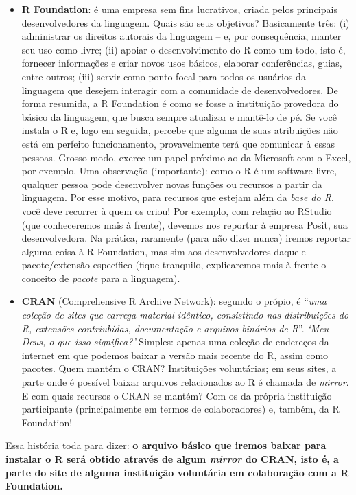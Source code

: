 \documentclass[
  letterpaper,
  DIV=11,
  numbers=noendperiod]{scrreprt}
\begin{document}
\begin{tcolorbox}
\begin{itemize}
\item
  \textbf{R Foundation}: é uma empresa sem fins lucrativos, criada pelos
  principais desenvolvedores da linguagem. Quais são seus objetivos?
  Basicamente três: (i) administrar os direitos autorais da linguagem --
  e, por consequência, manter seu uso como livre; (ii) apoiar o
  desenvolvimento do R como um todo, isto é, fornecer informações e
  criar novos usos básicos, elaborar conferências, guias, entre outros;
  (iii) servir como ponto focal para todos os usuários da linguagem que
  desejem interagir com a comunidade de desenvolvedores. De forma
  resumida, a R Foundation é como se fosse a instituição provedora do
  básico da linguagem, que busca sempre atualizar e mantê-lo de pé. Se
  você instala o R e, logo em seguida, percebe que alguma de suas
  atribuições não está em perfeito funcionamento, provavelmente terá que
  comunicar à essas pessoas. Grosso modo, exerce um papel próximo ao da
  Microsoft com o Excel, por exemplo. Uma observação (importante): como
  o R é um software livre, qualquer pessoa pode desenvolver novas
  funções ou recursos a partir da linguagem. Por esse motivo, para
  recursos que estejam além da \emph{base do R}, você deve recorrer à
  quem os criou! Por exemplo, com relação ao RStudio (que conheceremos
  mais à frente), devemos nos reportar à empresa Posit, sua
  desenvolvedora. Na prática, raramente (para não dizer nunca) iremos
  reportar alguma coisa à R Foundation, mas sim aos desenvolvedores
  daquele pacote/extensão específico (fique tranquilo, explicaremos mais
  à frente o conceito de \emph{pacote} para a linguagem).
\item
  \textbf{CRAN} (Comprehensive R Archive Network): segundo o própio, é
  ``\emph{uma coleção de sites que carrega material idêntico,
  consistindo nas distribuições do R, extensões contriubídas,
  documentação e arquivos binários de R}''. \emph{`Meu Deus, o que isso
  significa?'} Simples: apenas uma coleção de endereços da internet em
  que podemos baixar a versão mais recente do R, assim como pacotes.
  Quem mantém o CRAN? Instituições voluntárias; em seus sites, a parte
  onde é possível baixar arquivos relacionados ao R é chamada de
  \emph{mirror}. E com quais recursos o CRAN se mantém? Com os da
  própria instituição participante (principalmente em termos de
  colaboradores) e, também, da R Foundation!
\end{itemize}

Essa história toda para dizer: \textbf{o arquivo básico que iremos
baixar para instalar o R será obtido através de algum \emph{mirror} do
CRAN, isto é, a parte do site de alguma instituição voluntária em
colaboração com a R Foundation.}

\end{tcolorbox}
\end{document}
